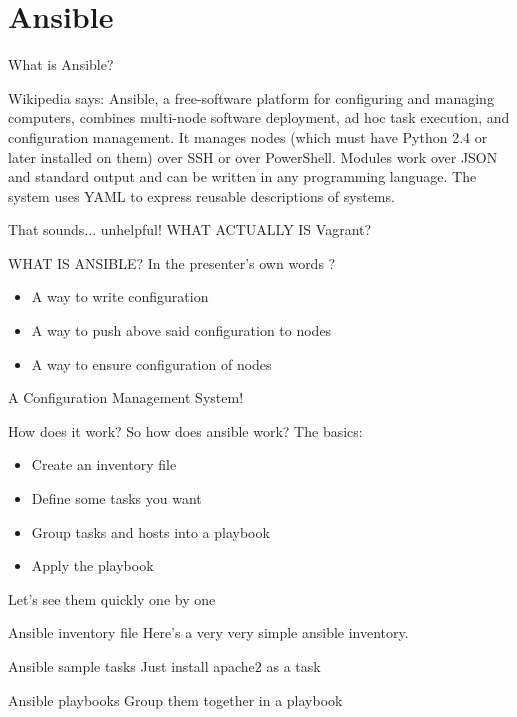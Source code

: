 \documentclass{beamer}
\begin{document}
\section{Ansible}
    \begin{frame}{What is Ansible?}
    \begin{block}{Wikipedia says:}
        Ansible, a free-software platform for configuring and managing computers, combines multi-node software deployment,
        ad hoc task execution, and configuration management. It manages nodes (which must have Python 2.4 or later installed on them)
        over SSH or over PowerShell. Modules work over JSON and standard output and can be written in any programming language.
        The system uses YAML to express reusable descriptions of systems.
    \end{block}
    \pause That sounds... unhelpful! WHAT ACTUALLY IS Vagrant?
    \end{frame}

    \begin{frame}{WHAT IS ANSIBLE?}
    In the presenter's own words ?
        \begin{itemize}
        \pause \item A way to write configuration
        \pause \item A way to push above said configuration to nodes
        \pause \item A way to ensure configuration of nodes
        \end{itemize}
    \begin{center}
        \pause A Configuration Management System!
    \end{center}
    \end{frame}

    \begin{frame}{How does it work?}
        So how does ansible work? The basics:
    \begin{itemize}
        \pause \item Create an inventory file
        \pause \item Define some tasks you want
        \pause \item Group tasks and hosts into a playbook
        \pause \item Apply the playbook
    \end{itemize}
    \pause  Let's see them quickly one by one
    \end{frame}

    \begin{frame}{Ansible inventory file}
        Here's a very very simple ansible inventory.
        
    \end{frame}
    \begin{frame}{Ansible sample tasks}
        Just install apache2 as a task
        
    \end{frame}
    \begin{frame}{Ansible playbooks}
        Group them together in a playbook
        
    \end{frame}
\end{document}
